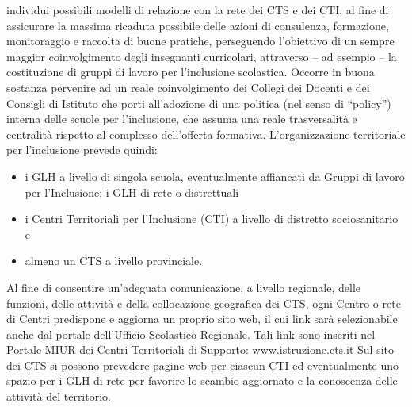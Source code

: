 individui possibili modelli di relazione con la rete dei CTS e dei CTI, al fine di assicurare la massima
ricaduta possibile delle azioni di consulenza, formazione, monitoraggio e raccolta di buone pratiche,
perseguendo l'obiettivo di un sempre maggior coinvolgimento degli insegnanti curricolari, attraverso – ad
esempio – la costituzione di gruppi di lavoro per l'inclusione scolastica. Occorre in buona sostanza
pervenire ad un reale coinvolgimento dei Collegi dei Docenti e dei Consigli di Istituto che porti all'adozione di una politica (nel senso di “policy”) interna delle scuole per l'inclusione, che assuma una
reale trasversalità e centralità rispetto al complesso dell'offerta formativa.
L'organizzazione territoriale per l'inclusione prevede quindi:
\begin{itemize}
	\item i GLH a livello di singola scuola, eventualmente affiancati da Gruppi di lavoro per l'Inclusione; i
	GLH di rete o distrettuali
	\item i Centri Territoriali per l'Inclusione (CTI) a livello di distretto sociosanitario e
	\item almeno un CTS a livello provinciale.
\end{itemize}
Al fine di consentire un'adeguata comunicazione, a livello regionale, delle funzioni, delle attività e della
collocazione geografica dei CTS, ogni Centro o rete di Centri predispone e aggiorna un proprio sito web, il
cui link sarà selezionabile anche dal portale dell'Ufficio Scolastico Regionale. Tali link sono inseriti nel
Portale MIUR dei Centri Territoriali di Supporto: www.istruzione.cts.it
Sul sito dei CTS si possono prevedere pagine web per ciascun CTI ed eventualmente uno spazio per i GLH
di rete per favorire lo scambio aggiornato e la conoscenza delle attività del territorio.

